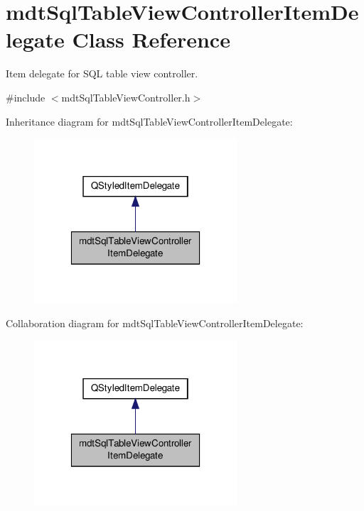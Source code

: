 \hypertarget{classmdt_sql_table_view_controller_item_delegate}{\section{mdt\-Sql\-Table\-View\-Controller\-Item\-Delegate Class Reference}
\label{classmdt_sql_table_view_controller_item_delegate}
}


Item delegate for S\-Q\-L table view controller.  




{\ttfamily \#include $<$mdt\-Sql\-Table\-View\-Controller.\-h$>$}



Inheritance diagram for mdt\-Sql\-Table\-View\-Controller\-Item\-Delegate\-:
\nopagebreak
\begin{figure}[H]
\begin{center}
\leavevmode
\includegraphics[width=214pt]{classmdt_sql_table_view_controller_item_delegate__inherit__graph}
\end{center}
\end{figure}


Collaboration diagram for mdt\-Sql\-Table\-View\-Controller\-Item\-Delegate\-:
\nopagebreak
\begin{figure}[H]
\begin{center}
\leavevmode
\includegraphics[width=214pt]{classmdt_sql_table_view_controller_item_delegate__coll__graph}
\end{center}
\end{figure}
